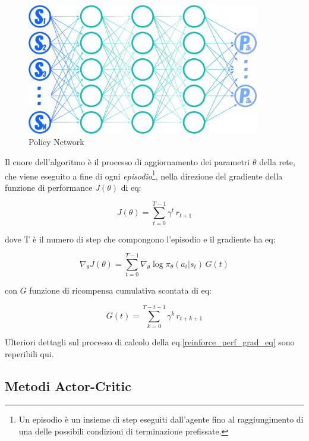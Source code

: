 \begin{figure}[hb]
    \centering
    \includegraphics[width = 4in]{Figures/Chapter2/policy_network.png}
    \caption{Policy Network}
    \label{fig:reinforce}
\end{figure}

Il cuore dell'algoritmo è il processo di aggiornamento dei parametri $\theta$ della rete, che viene eseguito a fine di ogni \textit{episodio}\footnote{Un episodio è un insieme di step eseguiti dall'agente fino al raggiungimento di una delle possibili condizioni di terminazione prefissate.}, nella direzione del gradiente della funzione di performance $J(\theta)$ di eq:

\begin{equation}\label{reinforce_perf_eq}
	J(\theta) = \sum_{t=0}^{T-1} \gamma^t \, r_{t+1}
\end{equation}

dove T è il numero di step che compongono l'episodio e il gradiente ha eq:

\begin{equation}\label{reinforce_perf_grad_eq}
	\nabla_{\theta} J(\theta) = \sum_{t=0}^{T-1} \nabla_{\theta} \log \pi_{\theta}(a_t|s_t) \, G(t)
\end{equation}

con $G$ funzione di ricompensa cumulativa scontata di eq: 

\begin{equation}
	G(t) = \sum_{k=0}^{T-t-1} \gamma^k\,r_{t+k+1}
\end{equation}

Ulteriori dettagli sul processo di calcolo della eq.\ref{reinforce_perf_grad_eq} sono reperibili qui\cite{reinforcemathWebsite}.

\clearpage

\subsection{Metodi Actor-Critic}

